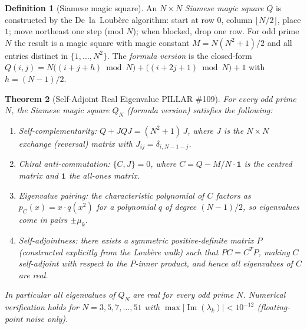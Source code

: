 \documentclass[aps,prd,twocolumn,superscriptaddress,floatfix,nofootinbib]{revtex4-2}
\newtheorem{theorem}{Theorem}
\theoremstyle{definition}
\newtheorem{definition}[theorem]{Definition}
\theoremstyle{remark}
\begin{document}
\begin{definition}[Siamese magic square]
An $N\times N$ \emph{Siamese magic square} $Q$ is constructed by the
De~la~Loub\`{e}re algorithm: start at row $0$, column $\lfloor N/2\rfloor$,
place $1$; move northeast one step (mod $N$); when blocked, drop one row.
For odd prime $N$ the result is a magic square with magic constant
$M = N(N^2+1)/2$ and all entries distinct in $\{1,\ldots,N^2\}$.
The \emph{formula version} is the closed-form
$Q(i,j) = N\bigl((i+j+h)\bmod N\bigr) + \bigl((i+2j+1)\bmod N\bigr) + 1$
with $h=(N-1)/2$.
\end{definition}

\begin{theorem}[Self-Adjoint Real Eigenvalue PILLAR \#109]
\label{thm:real-eigenvalue}
For every odd prime $N$, the Siamese magic square $Q_N$ (formula version)
satisfies the following:
\begin{enumerate}
  \item \emph{Self-complementarity}: $Q + J Q J = (N^2+1)\,J$,
        where $J$ is the $N\times N$ exchange (reversal) matrix
        with $J_{ij} = \delta_{i,N-1-j}$.
  \item \emph{Chiral anti-commutation}: $\{C, J\} = 0$,
        where $C = Q - M/N \cdot \mathbf{1}$ is the centred matrix and
        $\mathbf{1}$ the all-ones matrix.
  \item \emph{Eigenvalue pairing}: the characteristic polynomial of $C$
        factors as $p_C(x) = x \cdot q(x^2)$ for a polynomial $q$ of
        degree $(N-1)/2$, so eigenvalues come in pairs $\pm\mu_k$.
  \item \emph{Self-adjointness}: there exists a symmetric positive-definite
        matrix $P$ (constructed explicitly from the Loub\`{e}re walk) such that
        $P C = C^T P$, making $C$ self-adjoint with respect to the $P$-inner
        product, and hence all eigenvalues of $C$ are real.
\end{enumerate}
In particular all eigenvalues of $Q_N$ are real for every odd prime $N$.
Numerical verification holds for $N=3,5,7,\ldots,51$
with $\max|\operatorname{Im}(\lambda_k)| < 10^{-12}$ (floating-point noise only).
\end{theorem}
\end{document}
